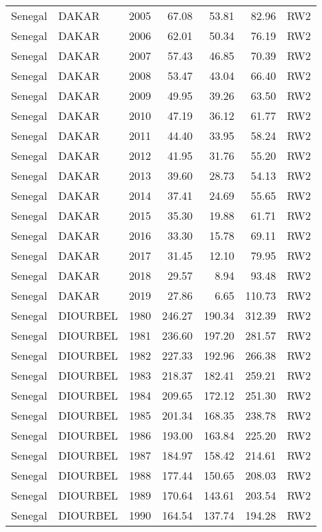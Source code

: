 \begin{longtable}{lllrrrl}
  Senegal & DAKAR & 2005 & 67.08 & 53.81 & 82.96 & RW2 \\ 
  Senegal & DAKAR & 2006 & 62.01 & 50.34 & 76.19 & RW2 \\ 
  Senegal & DAKAR & 2007 & 57.43 & 46.85 & 70.39 & RW2 \\ 
  Senegal & DAKAR & 2008 & 53.47 & 43.04 & 66.40 & RW2 \\ 
  Senegal & DAKAR & 2009 & 49.95 & 39.26 & 63.50 & RW2 \\ 
  Senegal & DAKAR & 2010 & 47.19 & 36.12 & 61.77 & RW2 \\ 
  Senegal & DAKAR & 2011 & 44.40 & 33.95 & 58.24 & RW2 \\ 
  Senegal & DAKAR & 2012 & 41.95 & 31.76 & 55.20 & RW2 \\ 
  Senegal & DAKAR & 2013 & 39.60 & 28.73 & 54.13 & RW2 \\ 
  Senegal & DAKAR & 2014 & 37.41 & 24.69 & 55.65 & RW2 \\ 
  Senegal & DAKAR & 2015 & 35.30 & 19.88 & 61.71 & RW2 \\ 
  Senegal & DAKAR & 2016 & 33.30 & 15.78 & 69.11 & RW2 \\ 
  Senegal & DAKAR & 2017 & 31.45 & 12.10 & 79.95 & RW2 \\ 
  Senegal & DAKAR & 2018 & 29.57 & 8.94 & 93.48 & RW2 \\ 
  Senegal & DAKAR & 2019 & 27.86 & 6.65 & 110.73 & RW2 \\ 
  Senegal & DIOURBEL & 1980 & 246.27 & 190.34 & 312.39 & RW2 \\ 
  Senegal & DIOURBEL & 1981 & 236.60 & 197.20 & 281.57 & RW2 \\ 
  Senegal & DIOURBEL & 1982 & 227.33 & 192.96 & 266.38 & RW2 \\ 
  Senegal & DIOURBEL & 1983 & 218.37 & 182.41 & 259.21 & RW2 \\ 
  Senegal & DIOURBEL & 1984 & 209.65 & 172.12 & 251.30 & RW2 \\ 
  Senegal & DIOURBEL & 1985 & 201.34 & 168.35 & 238.78 & RW2 \\ 
  Senegal & DIOURBEL & 1986 & 193.00 & 163.84 & 225.20 & RW2 \\ 
  Senegal & DIOURBEL & 1987 & 184.97 & 158.42 & 214.61 & RW2 \\ 
  Senegal & DIOURBEL & 1988 & 177.44 & 150.65 & 208.03 & RW2 \\ 
  Senegal & DIOURBEL & 1989 & 170.64 & 143.61 & 203.54 & RW2 \\ 
  Senegal & DIOURBEL & 1990 & 164.54 & 137.74 & 194.28 & RW2 \\ 

\end{longtable}
